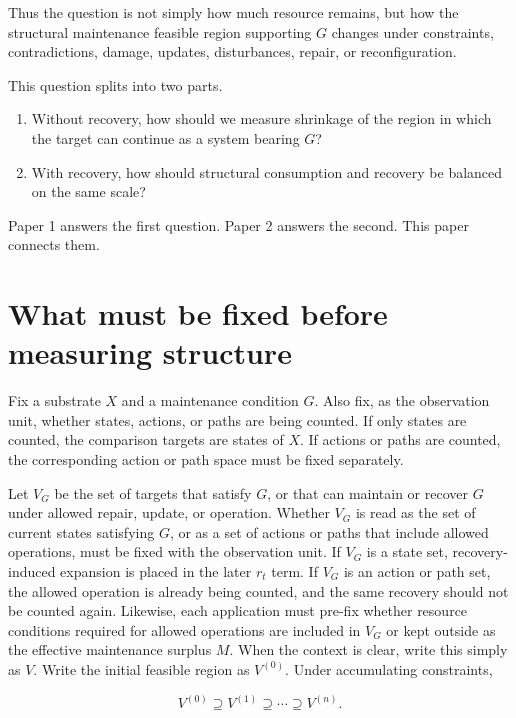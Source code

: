 \documentclass[12pt,a4paper]{article}
\begin{document}
Thus the question is not simply how much resource remains, but how the structural maintenance feasible region supporting \(G\) changes under constraints, contradictions, damage, updates, disturbances, repair, or reconfiguration.

This question splits into two parts.

\begin{enumerate}
\def\labelenumi{\arabic{enumi}.}
\tightlist
\item
  Without recovery, how should we measure shrinkage of the region in which the target can continue as a system bearing \(G\)?
\item
  With recovery, how should structural consumption and recovery be balanced on the same scale?
\end{enumerate}

Paper 1 answers the first question. Paper 2 answers the second. This paper connects them.

\section{What must be fixed before measuring structure}\label{what-must-be-fixed-before-measuring-structure}

Fix a substrate \(X\) and a maintenance condition \(G\). Also fix, as the observation unit, whether states, actions, or paths are being counted. If only states are counted, the comparison targets are states of \(X\). If actions or paths are counted, the corresponding action or path space must be fixed separately.

Let \(V_{G}\) be the set of targets that satisfy \(G\), or that can maintain or recover \(G\) under allowed repair, update, or operation. Whether \(V_{G}\) is read as the set of current states satisfying \(G\), or as a set of actions or paths that include allowed operations, must be fixed with the observation unit. If \(V_{G}\) is a state set, recovery-induced expansion is placed in the later \(r_{t}\) term. If \(V_{G}\) is an action or path set, the allowed operation is already being counted, and the same recovery should not be counted again. Likewise, each application must pre-fix whether resource conditions required for allowed operations are included in \(V_{G}\) or kept outside as the effective maintenance surplus \(M\). When the context is clear, write this simply as \(V\). Write the initial feasible region as \(V^{(0)}\). Under accumulating constraints,

\[
V^{(0)} \supseteq V^{(1)} \supseteq \cdots \supseteq V^{(n)}.
\]
\end{document}
